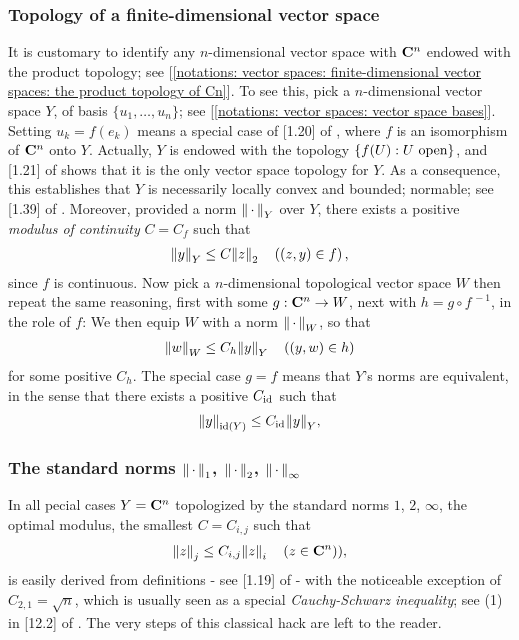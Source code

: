 \subsubsection{Topology of a finite-dimensional vector space}
It is customary to identify any $n$-dimensional vector space %
with $\C^n$ endowed with the product topology; %
see [\ref{notations: vector spaces: finite-dimensional vector spaces: the product topology of Cn}]. %
%
To see this, pick a $n$-dimensional vector space $Y$, of basis $\{u_1, \dots, u_n\}$; %
see [\ref{notations: vector spaces: vector space bases}]. %
%
Setting $u_k = f(e_k)$ means a special case of [1.20] of \cite{FA}, %
where $f$ is an isomorphism of $\C^n$ onto $Y$. %
%
Actually, $Y$ is endowed with the topology $\set{f(U)}{U \text{ open}}$, %
%
and [1.21] of \cite{FA} shows that it is the only vector space topology for $Y$. %
%
As a consequence, this establishes that $Y$ is necessarily locally convex and bounded; \ie normable; %
see [1.39] of \cite{FA}. %
Moreover, provided a norm $\norma{Y}{\,\cdot\,}$ over $Y$, there exists a positive {\it modulus of continuity} $C=C_f$ such that %
%
\begin{align}\label{norm equivalence 1}
  \norma{Y}{y} \leq C \norma{2}{z} \quad \left((z, y) \in f\right), 
\end{align}
%
since $f$ is continuous. %
%
Now pick a $n$-dimensional topological vector space $W$ then repeat the same reasoning, %
first with some $g: \C^n \to W$, %
next with $h = g\circ f^{\,\minus 1}$, in the role of $f$: %
%
We then equip $W$ with a norm $\norma{W}{\,\cdot\,}$, %
so that %
%
\begin{align}
  \norma{W}{w} \leq C_h \norma{Y}{y} \quad \left((y, w) \in h \right)
\end{align}
%
for some positive $C_h$. %
%
The special case $g=f$ means that $Y$'s norms are equivalent, %
in the sense that there exists a positive $C_{\id{}}$ such that %
\begin{align}
  \norma{\text{id}(Y)}{y} \leq C_{\id{}} \norma{Y}{y}, 
\end{align}
%
\subsubsection{The standard norms $\norma{1}{\,\cdot\,}$, $\norma{2}{\,\cdot\,}$, $\norma{\infty}{\,\cdot\,}$}
In all pecial cases $Y=\C^n$ topologized by the standard norms $1$, $2$, $\infty$, 
the optimal modulus, \ie the smallest $C = C_{i, j}$ such that %
\begin{align}
	\norma{j}{z} \leq C_{i, j} \norma{i}{z} \quad \left(z \in \C^n \right)),
\end{align}
is easily derived from definitions - see [1.19] of \cite{FA} - %
with the noticeable exception of $C_{2, 1}=\sqrt{n}$, which is usually seen as a special {\it Cauchy-Schwarz inequality}; %
see (1) in [12.2] of \cite{FA}. %
The very steps of this classical hack are left to the reader. %
